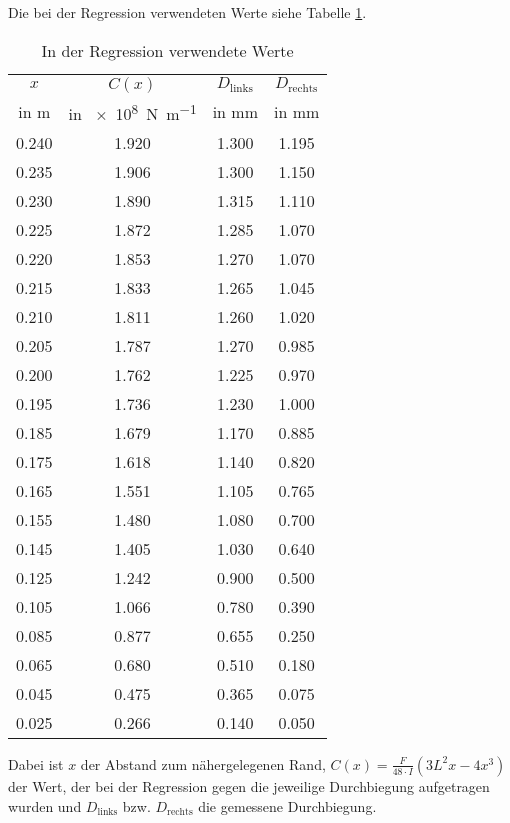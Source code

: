 Die bei der Regression verwendeten Werte siehe Tabelle \ref{Werte der Regression}.
\begin{table}
\begin{center}
\begin{tabular}{c | c | c | c}
	$x$ & $C(x)$ & $D_\text{links}$ & $D_\text{rechts}$ \\
	 in \si{\metre} & in \SI{e+8}{\newton\per\metre} & in \si{\milli\metre} & in \si{\milli\metre} \\
	\hline
	0.240 & 1.920 & 1.300 & 1.195 \\
	0.235 & 1.906 & 1.300 & 1.150 \\
	0.230 & 1.890 & 1.315 & 1.110 \\
	0.225 & 1.872 & 1.285 & 1.070 \\
	0.220 & 1.853 & 1.270 & 1.070 \\
	0.215 & 1.833 & 1.265 & 1.045 \\
	0.210 & 1.811 & 1.260 & 1.020 \\
	0.205 & 1.787 & 1.270 & 0.985 \\
	0.200 & 1.762 & 1.225 & 0.970 \\
	0.195 & 1.736 & 1.230 & 1.000\\
	0.185 & 1.679 & 1.170 & 0.885 \\
	0.175 & 1.618 & 1.140 & 0.820 \\
	0.165 & 1.551 & 1.105 & 0.765 \\
	0.155 & 1.480 & 1.080 & 0.700 \\
	0.145 & 1.405 & 1.030 & 0.640 \\
	0.125 & 1.242 & 0.900 & 0.500 \\
	0.105 & 1.066 & 0.780 & 0.390 \\
	0.085 & 0.877 & 0.655 & 0.250 \\
	0.065 & 0.680 & 0.510 & 0.180 \\
	0.045 & 0.475 & 0.365 & 0.075 \\
	0.025 & 0.266 & 0.140 & 0.050
\end{tabular}
\end{center}
\caption{In der Regression verwendete Werte}
\label{Werte der Regression}
\end{table}
Dabei ist $x$ der Abstand zum nähergelegenen Rand, $C(x) = \frac{F}{48\cdot I}\left(3L^2x-4x^3\right)$ der Wert, der bei der Regression gegen die jeweilige Durchbiegung aufgetragen wurden und $D_\text{links}$ bzw. $D_\text{rechts}$ die gemessene Durchbiegung.